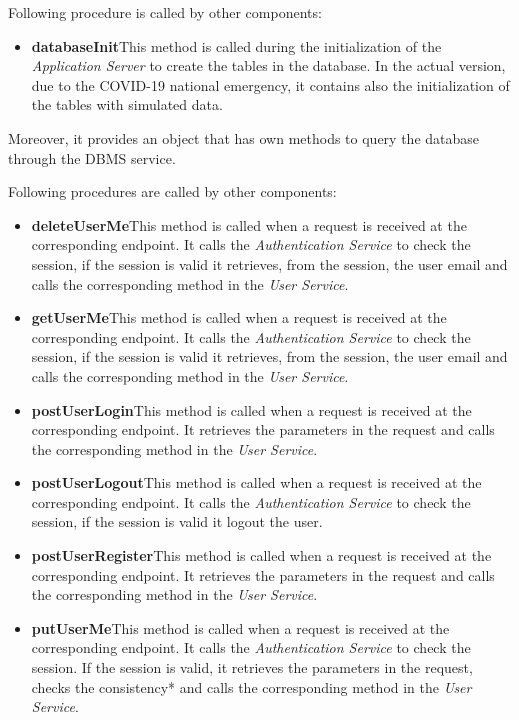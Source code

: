 Following procedure is called by other components:
\begin{itemize}
    \item \textbf{databaseInit}\quad This method is called during the initialization of the \textit{Application Server} to create the tables in the database. In the actual version, due to the COVID-19 national emergency, it contains also the initialization of the tables with simulated data.
\end{itemize}

Moreover, it provides an object that has own methods to query the database through the DBMS service.

Following procedures are called by other components:
\begin{itemize}
    \item \textbf{deleteUserMe}\quad This method is called when a request is received at the corresponding endpoint. It calls the \textit{Authentication Service} to check the session, if the session is valid it retrieves, from the session, the user email and calls the corresponding method in the \textit{User Service}.
    \item \textbf{getUserMe}\quad This method is called when a request is received at the corresponding endpoint. It calls the \textit{Authentication Service} to check the session, if the session is valid it retrieves, from the session, the user email and calls the corresponding method in the \textit{User Service}.
    \item \textbf{postUserLogin}\quad This method is called when a request is received at the corresponding endpoint. It retrieves the parameters in the request and calls the corresponding method in the \textit{User Service}.
    \item \textbf{postUserLogout}\quad This method is called when a request is received at the corresponding endpoint. It calls the \textit{Authentication Service} to check the session, if the session is valid it logout the user.
    \item \textbf{postUserRegister}\quad This method is called when a request is received at the corresponding endpoint. It retrieves the parameters in the request and calls the corresponding method in the \textit{User Service}.
    \item \textbf{putUserMe}\quad This method is called when a request is received at the corresponding endpoint. It calls the \textit{Authentication Service} to check the session. If the session is valid, it retrieves the parameters in the request, checks the consistency* and calls the corresponding method in the \textit{User Service}.
\end{itemize}

